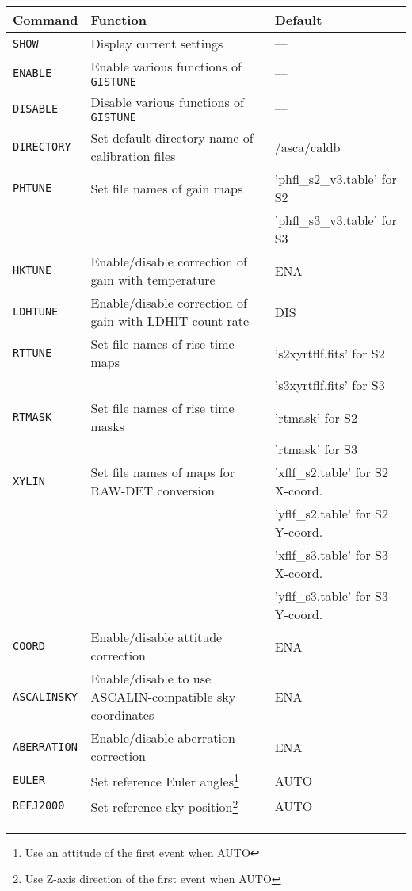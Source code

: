 \begin{table}[htb]
\begin{minipage}{\textwidth}
\begin{center}
\begin{tabular}{|l|l|l|}
\hline
Command & Function & Default \\ \hline
{\tt SHOW}
	& Display current settings
	& --- \\
{\tt ENABLE}
	& Enable various functions of {\tt GISTUNE}
	& --- \\
{\tt DISABLE}
	& Disable various functions of {\tt GISTUNE}
	& --- \\
{\tt DIRECTORY}
	& Set default directory name of calibration files
	& /asca/caldb \\
{\tt PHTUNE}
	& Set file names of gain maps
	& 'phfl\_s2\_v3.table' for S2 \\
	&
	& 'phfl\_s3\_v3.table' for S3 \\
{\tt HKTUNE}
	& Enable/disable correction of gain with temperature
	& ENA \\
{\tt LDHTUNE}
	& Enable/disable correction of gain with LDHIT count rate
	& DIS \\
{\tt RTTUNE}
	& Set file names of rise time maps
	& 's2xyrtflf.fits' for S2 \\
	& 
	& 's3xyrtflf.fits' for S3 \\
{\tt RTMASK}
	& Set file names of rise time masks
	& 'rtmask' for S2 \\
	&
	& 'rtmask' for S3 \\
{\tt XYLIN}
	& Set file names of maps for RAW-DET conversion
	& 'xflf\_s2.table' for S2 X-coord. \\
	& 
	& 'yflf\_s2.table' for S2 Y-coord. \\
	&
	& 'xflf\_s3.table' for S3 X-coord. \\
	&
	& 'yflf\_s3.table' for S3 Y-coord. \\
{\tt COORD}
	& Enable/disable attitude correction
	& ENA \\
{\tt ASCALINSKY}
	& Enable/disable to use ASCALIN-compatible sky coordinates
	& ENA \\
{\tt ABERRATION}
	& Enable/disable aberration correction
	& ENA \\
{\tt EULER}
	& Set reference Euler angles\footnote{
		Use an attitude of the first event when AUTO}
	& AUTO \\
{\tt REFJ2000}
	& Set reference sky position\footnote{
		Use Z-axis direction of the first event when AUTO}
	& AUTO \\

\end{tabular}
\end{center}
\end{minipage}
\end{table}
